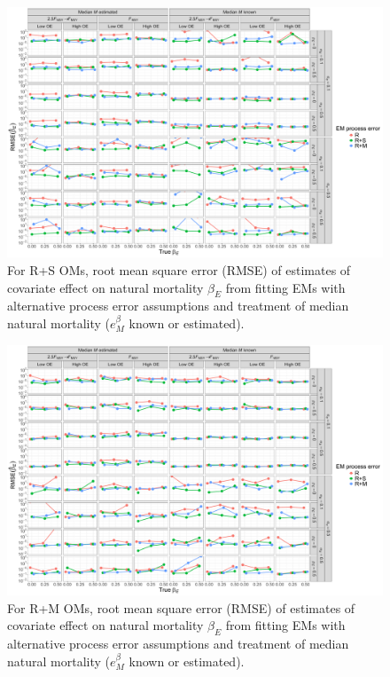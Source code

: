 \documentclass[
  12pt,
]{article}
\begin{document}
\begin{landscape}
\begin{figure}
\begin{center}
\includegraphics[height = \textheight]{beta_E_rmse_RSom}
\end{center}
\caption{For R+S OMs, root mean square error (RMSE) of estimates of covariate effect on natural mortality $\beta_E$ from fitting EMs with alternative process error assumptions and treatment of median natural mortality ($e^\beta_M$ known or estimated). }\label{beta_E_rmse_RSom}
\end{figure}
\end{landscape}

\begin{landscape}
\begin{figure}
\begin{center}
\includegraphics[height = \textheight]{beta_E_rmse_RMom}
\end{center}
\caption{For R+M OMs, root mean square error (RMSE) of estimates of covariate effect on natural mortality $\beta_E$ from fitting EMs with alternative process error assumptions and treatment of median natural mortality ($e^\beta_M$ known or estimated). }\label{beta_E_rmse_RMom}
\end{figure}
\end{landscape}
\end{document}
